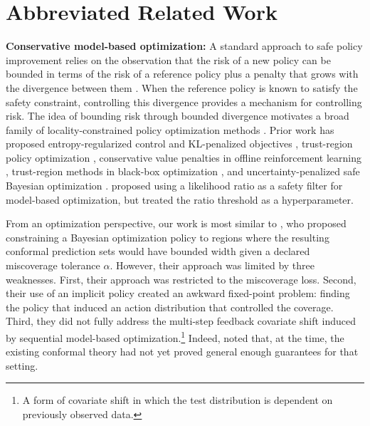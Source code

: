 \section{Abbreviated Related Work}
\label{sec:related_work}


\textbf{Conservative model-based optimization:}
A standard approach to safe policy improvement relies on the observation that the risk of a new policy can be bounded in terms of the risk of a reference policy plus a penalty that grows with the divergence between them \citep{kakade2002approximately}.
When the reference policy is known to satisfy the safety constraint, controlling this divergence provides a mechanism for controlling risk.
The idea of bounding risk through bounded divergence motivates a broad family of locality-constrained policy optimization methods \citep{kim2025offline}.
Prior work has proposed entropy-regularized control and KL-penalized objectives \citep{todorov2009efficient, fox2015taming}, trust-region policy optimization \citep{schulman2015trust, schulman2017proximal}, conservative value penalties in offline reinforcement learning \citep{kumar2020conservative, trabucco2021conservative}, trust-region methods in black-box optimization \citep{eriksson2019scalable}, and uncertainty-penalized safe Bayesian optimization \citep{sui2015safe}.
\citet{damani2023beyond} proposed using a likelihood ratio as a safety filter for model-based optimization, but treated the ratio threshold as a hyperparameter.

From an optimization perspective, our work is most similar to \citet{stanton2023bayesian}, who proposed constraining a Bayesian optimization policy to regions where the resulting conformal prediction sets would have bounded width given a declared miscoverage tolerance $\alpha$.
However, their approach was limited by three weaknesses.
First, their approach was restricted to the miscoverage loss.
Second, their use of an implicit policy created an awkward fixed-point problem: finding the policy that induced an action distribution that controlled the coverage.
Third, they did not fully address the multi-step feedback covariate shift induced by sequential model-based optimization.\footnote{A form of covariate shift in which the test distribution is dependent on previously observed data.}
Indeed, \citet{stanton2023bayesian} noted that, at the time, the existing conformal theory had not yet proved general enough guarantees 
for that setting.

